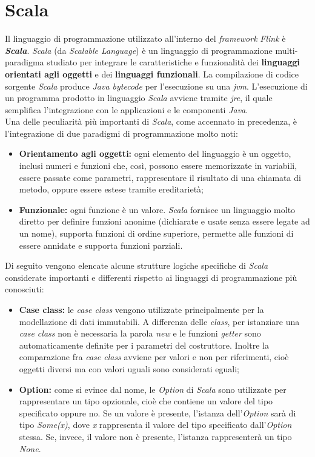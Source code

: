 \section{Scala}\label{sec:scala}
Il linguaggio di programmazione utilizzato all'interno del \textit{\textit{\gls{framework}}} \textit{Flink} è \textbf{\textit{Scala}}. \textit{Scala} (da \textit{Scalable Language}) è un linguaggio di programmazione multi-paradigma studiato per integrare le caratteristiche e funzionalità dei \textbf{linguaggi orientati agli oggetti} e dei \textbf{linguaggi funzionali}. La compilazione di codice sorgente \textit{Scala} produce \textit{Java bytecode} per l'esecuzione su una \textit{\gls{jvm}}. L'esecuzione di un programma prodotto in linguaggio \textit{Scala} avviene tramite \textit{\gls{jre}}, il quale semplifica l'integrazione con le applicazioni e le componenti \textit{Java}.\\
Una delle peculiarità più importanti di \textit{Scala}, come accennato in precedenza, è l'integrazione di due paradigmi di programmazione molto noti:
\begin{itemize}
	\item{\textbf{Orientamento agli oggetti:} ogni elemento del linguaggio è un oggetto, inclusi numeri e funzioni che, così, possono essere memorizzate in variabili, essere passate come parametri, rappresentare il risultato di una chiamata di metodo, oppure essere estese tramite ereditarietà;}
	\item{\textbf{Funzionale:} ogni funzione è un valore. \textit{Scala} fornisce un linguaggio molto diretto per definire funzioni anonime (dichiarate e usate senza essere legate ad un nome), supporta funzioni di ordine superiore, permette alle funzioni di essere annidate e supporta funzioni parziali.}
\end{itemize}
Di seguito vengono elencate alcune strutture logiche specifiche di \textit{Scala} considerate importanti e differenti rispetto ai linguaggi di programmazione più conosciuti:
\begin{itemize}
	\item{\textbf{Case class:} le \textit{case class} vengono utilizzate principalmente per la modellazione di dati immutabili. A differenza delle \textit{class}, per istanziare una \textit{case class} non è necessaria la parola \textit{new} e le funzioni \textit{getter} sono automaticamente definite per i parametri del costruttore. Inoltre la comparazione fra \textit{case class} avviene per valori e non per riferimenti, cioè oggetti diversi ma con valori uguali sono considerati eguali;}
	\item{\textbf{Option:} come si evince dal nome, le \textit{Option} di \textit{Scala} sono utilizzate per rappresentare un tipo opzionale, cioè che contiene un valore del tipo specificato oppure no. Se un valore è presente, l'istanza dell'\textit{Option} sarà di tipo \textit{Some(x)}, dove \textit{x} rappresenta il valore del tipo specificato dall'\textit{Option} stessa. Se, invece, il valore non è presente, l'istanza rappresenterà un tipo \textit{None}.}
\end{itemize}

